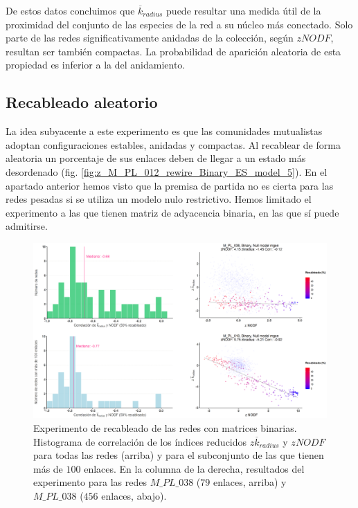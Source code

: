 De estos datos concluimos que $\overline k_{radius}$ puede resultar una medida útil de la proximidad del conjunto de las especies de la red a su núcleo más conectado. Solo parte de las redes significativamente anidadas de la colección, según $zNODF$, resultan ser también compactas. La probabilidad de aparición aleatoria de esta propiedad es inferior a la del anidamiento.


\subsection{Recableado aleatorio}

La idea subyacente a este experimento es que las comunidades mutualistas adoptan configuraciones estables, anidadas y compactas. Al recablear de forma aleatoria un porcentaje de sus enlaces deben de llegar a un estado más desordenado (fig. \ref{fig:z_M_PL_012_rewire_Binary_ES_model_5}). En el apartado anterior hemos visto que la premisa de partida no es cierta para las redes pesadas si se utiliza un modelo nulo restrictivo. Hemos limitado el experimento a las que tienen matriz de adyacencia binaria, en las que sí puede admitirse.

\begin{figure}[h!]
\centering
\includegraphics[scale=0.35]{Figures/ESTATICA_histo_corr_rewiring_ES.eps}
\caption {Experimento de recableado de las redes con matrices binarias. Histograma de correlación de los índices reducidos $z \overline {k}_{radius}$ y $zNODF$ para todas las redes (arriba) y para el subconjunto de las que tienen más de $100$ enlaces. En la columna de la derecha, resultados del experimento para las redes  $M\_PL\_038$ ($79$ enlaces, arriba) y $M\_PL\_038$ ($456$ enlaces, abajo).}
\label{fig:ESTATICA_histo_corr_rewiring}
\end{figure}

